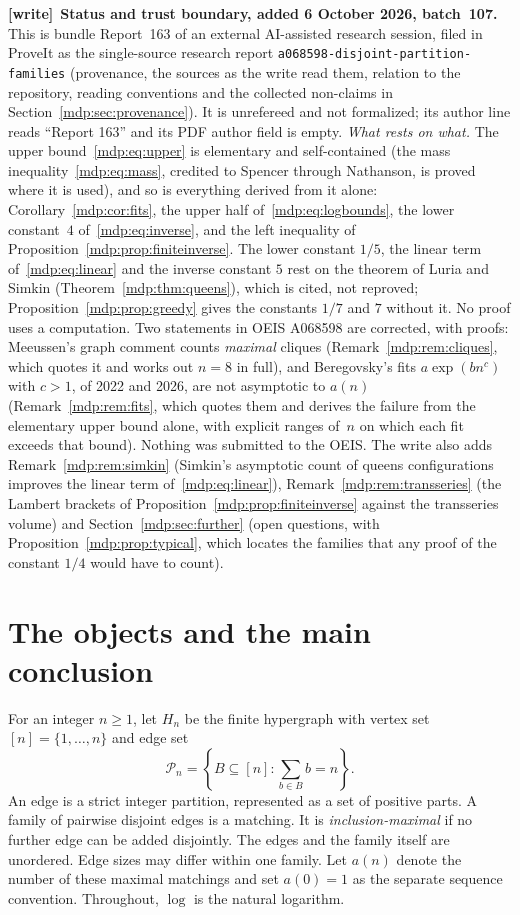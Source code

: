 \documentclass[11pt,letterpaper]{article}
\numberwithin{equation}{section}
\theoremstyle{remark}\newtheorem{remark}[theorem]{Remark}
\newcommand{\file}[1]{\nolinkurl{#1}}
\newenvironment{writenote}[1][]{\par\smallskip\begingroup\small
 \noindent\textbf{[write]}\if\relax\detokenize{#1}\relax\else~\textbf{#1.}\fi\ }%
 {\par\endgroup\smallskip}
\begin{document}
\begin{writenote}[Status and trust boundary, added 6 October 2026, batch~107]
This is bundle Report~163 of an external AI-assisted research session, filed
in ProveIt as the single-source research report
\file{a068598-disjoint-partition-families} (provenance, the sources as the
write read them, relation to the repository, reading conventions and the
collected non-claims in Section~\ref{mdp:sec:provenance}). It is unrefereed
and not formalized; its author line reads ``Report 163'' and its PDF author
field is empty. \emph{What rests on what.} The upper
bound~\eqref{mdp:eq:upper} is elementary and self-contained (the mass
inequality~\eqref{mdp:eq:mass}, credited to Spencer through Nathanson, is
proved where it is used), and so is everything derived from it alone:
Corollary~\ref{mdp:cor:fits}, the upper half of~\eqref{mdp:eq:logbounds},
the lower constant~$4$ of~\eqref{mdp:eq:inverse}, and the left inequality of
Proposition~\ref{mdp:prop:finiteinverse}. The lower constant $1/5$, the
linear term of~\eqref{mdp:eq:linear} and the inverse constant $5$ rest on the
theorem of Luria and Simkin (Theorem~\ref{mdp:thm:queens}), which is cited,
not reproved; Proposition~\ref{mdp:prop:greedy} gives the constants $1/7$
and $7$ without it. No proof uses a computation. Two statements in OEIS
A068598 are corrected, with proofs: Meeussen's graph comment counts
\emph{maximal} cliques (Remark~\ref{mdp:rem:cliques}, which quotes it and
works out $n=8$ in full), and Beregovsky's fits $a\exp(bn^c)$ with $c>1$, of
2022 and 2026, are not asymptotic to $a(n)$ (Remark~\ref{mdp:rem:fits},
which quotes them and derives the failure from the elementary upper bound
alone, with explicit ranges of~$n$ on which each fit exceeds that bound).
Nothing was submitted to the OEIS. The write also adds
Remark~\ref{mdp:rem:simkin} (Simkin's asymptotic count of queens
configurations improves the linear term of~\eqref{mdp:eq:linear}),
Remark~\ref{mdp:rem:transseries} (the Lambert brackets of
Proposition~\ref{mdp:prop:finiteinverse} against the transseries volume) and
Section~\ref{mdp:sec:further} (open questions, with
Proposition~\ref{mdp:prop:typical}, which locates the families that any proof
of the constant $1/4$ would have to count).
\end{writenote}
\tableofcontents

\section{The objects and the main conclusion}
For an integer $n\ge1$, let $H_n$ be the finite hypergraph with vertex set
$[n]=\{1,\ldots,n\}$ and edge set
\[
 \mathcal P_n=\left\{B\subseteq[n]:\sum_{b\in B}b=n\right\}.
\]
An edge is a strict integer partition, represented as a set of positive
parts. A family of pairwise disjoint edges is a matching. It is
\emph{inclusion-maximal} if no further edge can be added disjointly.
The edges and the family itself are unordered. Edge sizes may differ
within one family. Let $a(n)$ denote the number of these maximal
matchings and set $a(0)=1$ as the separate sequence convention.
Throughout, $\log$ is the natural logarithm.
\end{document}
